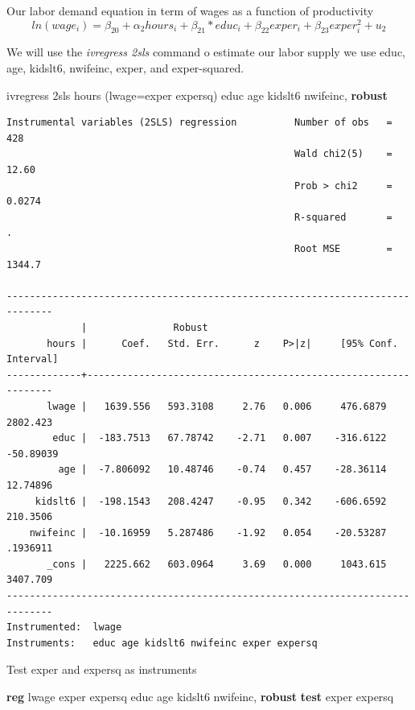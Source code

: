 \documentclass[
]{book}
\newenvironment{Shaded}{\begin{snugshade}}{\end{snugshade}}
\newcommand{\KeywordTok}[1]{\textcolor[rgb]{0.13,0.29,0.53}{\textbf{#1}}}
\newcommand{\NormalTok}[1]{#1}
\begin{document}
Our labor demand equation in term of wages as a function of productivity
\[ ln(wage_i)= \beta_{20} + \alpha_2 hours_i  + \beta_{21}*educ_i+ \beta_{22} exper_i + \beta_{23} exper^2_i + u_2 \]

We will use the \emph{ivregress 2sls} command o estimate our labor supply we use educ, age, kidslt6, nwifeinc, exper, and exper-squared.

\begin{Shaded}
\begin{Highlighting}[]
\NormalTok{ivregress 2sls hours (lwage=exper expersq) educ age kidslt6 nwifeinc, }\KeywordTok{robust}
\end{Highlighting}
\end{Shaded}

\begin{verbatim}
Instrumental variables (2SLS) regression          Number of obs   =        428
                                                  Wald chi2(5)    =      12.60
                                                  Prob > chi2     =     0.0274
                                                  R-squared       =          .
                                                  Root MSE        =     1344.7

------------------------------------------------------------------------------
             |               Robust
       hours |      Coef.   Std. Err.      z    P>|z|     [95% Conf. Interval]
-------------+----------------------------------------------------------------
       lwage |   1639.556   593.3108     2.76   0.006     476.6879    2802.423
        educ |  -183.7513   67.78742    -2.71   0.007    -316.6122   -50.89039
         age |  -7.806092   10.48746    -0.74   0.457    -28.36114    12.74896
     kidslt6 |  -198.1543   208.4247    -0.95   0.342    -606.6592    210.3506
    nwifeinc |  -10.16959   5.287486    -1.92   0.054    -20.53287    .1936911
       _cons |   2225.662   603.0964     3.69   0.000     1043.615    3407.709
------------------------------------------------------------------------------
Instrumented:  lwage
Instruments:   educ age kidslt6 nwifeinc exper expersq
\end{verbatim}

Test exper and expersq as instruments

\begin{Shaded}
\begin{Highlighting}[]
\KeywordTok{reg}\NormalTok{ lwage exper expersq educ age kidslt6 nwifeinc, }\KeywordTok{robust}
\KeywordTok{test}\NormalTok{ exper expersq}
\end{Highlighting}
\end{Shaded}
\end{document}
